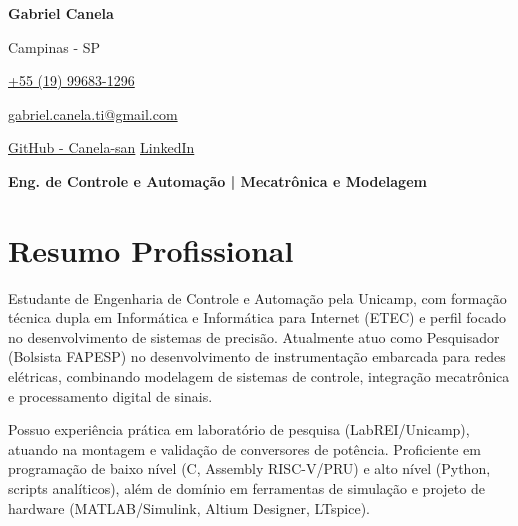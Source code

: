 \documentclass[a4paper,10pt]{article}
\begin{document}

\noindent
\begin{minipage}[t]{0.5\textwidth}
\textbf{\Huge Gabriel Canela}

\vspace{0.4em}

\end{minipage}%
\begin{minipage}[t]{0.5\textwidth}
\raggedleft

Campinas - SP

\href{tel:+5519996831296}{\faPhone \space +55 (19) 99683-1296}

\href{mailto:gabriel.canela.ti@gmail.com}{\faEnvelope \space gabriel.canela.ti@gmail.com}

\vspace{0.2em}

\href{https://github.com/Canela-san}{\faGithub \space GitHub - Canela-san} \quad
\href{https://www.linkedin.com/in/gabriel-canela-ti/}{\faLinkedin \space LinkedIn}
\end{minipage}

\vspace{1em}

\begin{center}
    \textbf{\Large Eng. de Controle e Automação | Mecatrônica e Modelagem}
\end{center}

\vspace{0.5em}

\section*{Resumo Profissional}

Estudante de Engenharia de Controle e Automação pela Unicamp, com formação técnica dupla em Informática e Informática para Internet (ETEC) e perfil focado no desenvolvimento de sistemas de precisão. Atualmente atuo como Pesquisador (Bolsista FAPESP) no desenvolvimento de instrumentação embarcada para redes elétricas, combinando modelagem de sistemas de controle, integração mecatrônica e processamento digital de sinais.

Possuo experiência prática em laboratório de pesquisa (LabREI/Unicamp), atuando na montagem e validação de conversores de potência. Proficiente em programação de baixo nível (C, Assembly RISC-V/PRU) e alto nível (Python, scripts analíticos), além de domínio em ferramentas de simulação e projeto de hardware (MATLAB/Simulink, Altium Designer, LTspice).
\end{document}
